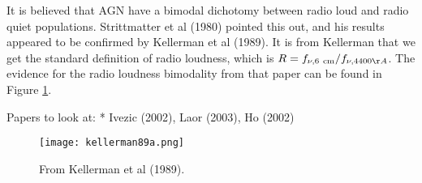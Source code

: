 \documentclass[11pt, preprint]{aastex}
\begin{document}
It is believed that AGN have a bimodal dichotomy between radio loud
and radio quiet populations.  Strittmatter et al (1980) pointed this
out, and his results appeared to be confirmed by Kellerman et al
(1989). It is from Kellerman that we get the standard definition of
radio loudness, which is $R = f_{\nu, {\rm 6~cm}} / f_{\nu,
  4400\AA}$. The evidence for the radio loudness bimodality from that
paper can be found in Figure \ref{fig:kellerman89a}.

Papers to look at:
 * Ivezic (2002), Laor (2003), Ho (2002)

\begin{figure}
  \texttt{[image: kellerman89a.png]}
  \caption{\label{fig:kellerman89a} From Kellerman et al (1989).}
\end{figure}
\end{document}
